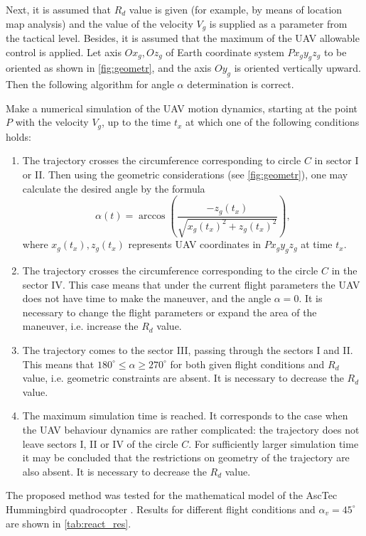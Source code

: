 \documentclass[review]{elsarticle}
\begin{document}
Next, it is assumed that $R_d$ value is given (for example, by means of location map analysis) and the value of the velocity $V_g$ is supplied as a parameter from the tactical level. Besides, it is assumed that the maximum of the UAV allowable control is applied. Let axis $Ox_g,Oz_g$ of Earth coordinate system $Px_gy_gz_g$ to be oriented as shown in \autoref{fig:geometr}, and the axis $Oy_g$ is oriented vertically upward. Then the following algorithm for angle $\alpha$ determination is correct. 

Make a numerical simulation of the UAV motion dynamics, starting at the point $P$ with the velocity $V_g$, up to the time $t_x$ at which one of the following conditions holds:
\begin{enumerate}
	\item The trajectory crosses the circumference corresponding to circle $C$ in sector I or II. Then using the geometric considerations (see \autoref{fig:geometr}), one may calculate the desired angle by the formula
	\[
	\alpha (t)=\arccos \left( \frac{-{{z}_{g}}({{t}_{x}})}{\sqrt{{{x}_{g}}{{({{t}_{x}})}^{2}}+{{z}_{g}}{{({{t}_{x}})}^{2}}}} \right),
	\]
	where ${{x}_{g}}({{t}_{x}}),{{z}_{g}}({{t}_{x}})$ represents UAV coordinates in $Px_gy_gz_g$ at time $t_x$.
	\item The trajectory crosses the circumference corresponding to the circle $C$ in the sector IV. This case means that under the current flight parameters the UAV does not have time to make the maneuver, and the angle $\alpha=0$. It is necessary to change the flight parameters or expand the area of the maneuver, i.e. increase the $R_d$ value.
	\item The trajectory comes to the sector III, passing through the sectors I and II. This means that $180^\circ\leq\alpha\geq 270^\circ$ for both given flight conditions and $R_d$ value, i.e. geometric constraints are absent. It is necessary to decrease the $R_d$ value.
	\item The maximum simulation time is reached. It corresponds to the case when the UAV behaviour dynamics are rather complicated: the trajectory does not leave sectors I, II or IV of the circle $C$. For sufficiently larger simulation time it may be concluded that the restrictions on geometry of the trajectory are also absent. It is necessary to decrease the $R_d$ value.
\end{enumerate}

The proposed method was tested for the mathematical model of the AscTec Hummingbird quadrocopter \cite{AsTec}. Results for different flight conditions and $\alpha_v=45^\circ$ are shown in \autoref{tab:react_res}.
\end{document}
